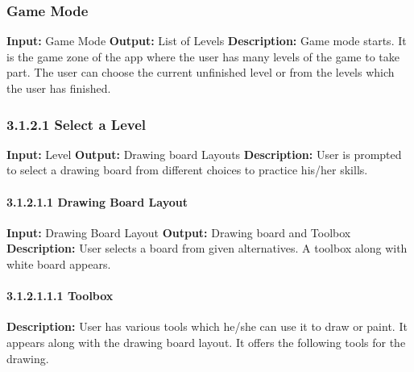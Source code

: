 \documentclass{scrreprt}
\begin{document}
\subsubsection{Game Mode}
\textbf{Input:} Game Mode \newline
\textbf{Output:} List of Levels
\vspace{1mm}\newline
\textbf{Description:} \newline 
Game mode starts. It is the game zone of the app where the user has many levels of the game to take part. The user can choose the current unfinished level or from the levels which the user has finished.

\subsubsection{3.1.2.1 Select a Level}
\textbf{Input:} Level \newline
\textbf{Output:} Drawing board Layouts
\vspace{1mm}\newline
\textbf{Description:} \newline 
User is prompted to select a drawing board from different choices to practice his/her skills.

\paragraph{3.1.2.1.1 Drawing Board Layout}
\hfill \vspace{2.5mm} \break 
\textbf{Input:} Drawing Board Layout \newline
\textbf{Output:} Drawing board and Toolbox
\vspace{1mm}\newline
\textbf{Description:} \newline 
User selects a board from given alternatives. A toolbox along with white board appears.

\paragraph{3.1.2.1.1.1 Toolbox}
\hfill \vspace{2.5mm} \break 
\textbf{Description:} \newline
User has various tools which
he/she can use it to draw or paint. It appears along with the drawing board layout. It offers the following tools for the drawing.
\end{document}
